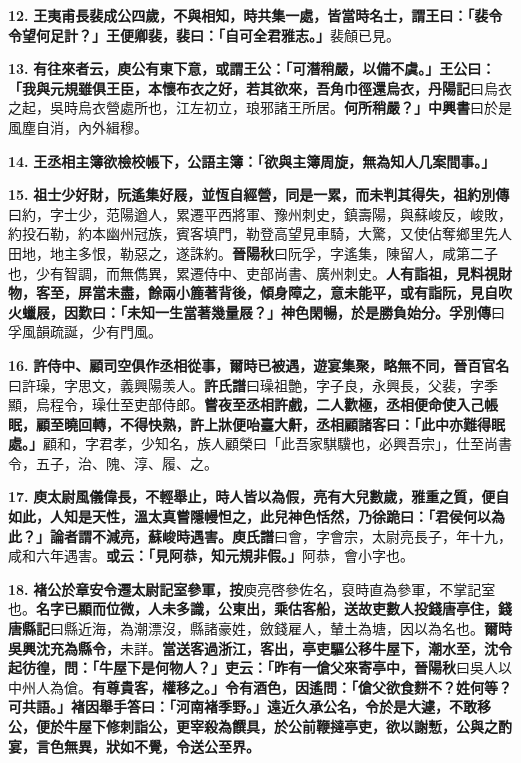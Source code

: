 \textbf{12.} \textbf{王夷甫長裴成公四歲，不與相知，時共集一處，皆當時名士，謂王曰：「裴令令望何足計？」王便卿裴，裴曰：「自可全君雅志。」}{\footnotesize 裴頠已見。}

\textbf{13.} \textbf{有往來者云，庾公有東下意，或謂王公：「可潛稍嚴，以備不虞。」王公曰：「我與元規雖俱王臣，本懷布衣之好，若其欲來，吾角巾徑還烏衣，}{\footnotesize \textbf{丹陽記}曰烏衣之起，吳時烏衣營處所也，江左初立，琅邪諸王所居。}\textbf{何所稍嚴？」}{\footnotesize \textbf{中興書}曰於是風塵自消，內外緝穆。}

\textbf{14.} \textbf{王丞相主簿欲檢校帳下，公語主簿：「欲與主簿周旋，無為知人几案間事。」}

\textbf{15.} \textbf{祖士少好財，阮遙集好屐，並恆自經營，同是一累，而未判其得失，}{\footnotesize \textbf{祖約別傳}曰約，字士少，范陽遒人，累遷平西將軍、豫州刺史，鎮壽陽，與蘇峻反，峻敗，約投石勒，約本幽州冠族，賓客填門，勒登高望見車騎，大驚，又使佔奪鄉里先人田地，地主多恨，勒惡之，遂誅約。\textbf{晉陽秋}曰阮孚，字遙集，陳留人，咸第二子也，少有智調，而無儁異，累遷侍中、吏部尚書、廣州刺史。}\textbf{人有詣祖，見料視財物，客至，屏當未盡，餘兩小簏著背後，傾身障之，意未能平，或有詣阮，見自吹火蠟屐，因歎曰：「未知一生當著幾量屐？」神色閑暢，於是勝負始分。}{\footnotesize \textbf{孚別傳}曰孚風韻疏誕，少有門風。}

\textbf{16.} \textbf{許侍中、顧司空俱作丞相從事，爾時已被遇，遊宴集聚，略無不同，}{\footnotesize \textbf{晉百官名}曰許璪，字思文，義興陽羡人。\textbf{許氏譜}曰璪祖艶，字子良，永興長，父裴，字季顯，烏程令，璪仕至吏部侍郎。}\textbf{嘗夜至丞相許戲，二人歡極，丞相便命使入己帳眠，顧至曉回轉，不得快熟，許上牀便咍臺大鼾，丞相顧諸客曰：「此中亦難得眠處。」}{\footnotesize 顧和，字君孝，少知名，族人顧榮曰「此吾家騏驥也，必興吾宗」，仕至尚書令，五子，治、隗、淳、履、之。}

\textbf{17.} \textbf{庾太尉風儀偉長，不輕舉止，時人皆以為假，亮有大兒數歲，雅重之質，便自如此，人知是天性，溫太真嘗隱幔怛之，此兒神色恬然，乃徐跪曰：「君侯何以為此？」論者謂不減亮，蘇峻時遇害。}{\footnotesize \textbf{庾氏譜}曰會，字會宗，太尉亮長子，年十九，咸和六年遇害。}\textbf{或云：「見阿恭，知元規非假。」}{\footnotesize 阿恭，會小字也。}

\textbf{18.} \textbf{褚公於章安令遷太尉記室參軍，}{\footnotesize \textbf{按}庾亮啓參佐名，裒時直為參軍，不掌記室也。}\textbf{名字已顯而位微，人未多識，公東出，乘估客船，送故吏數人投錢唐亭住，}{\footnotesize \textbf{錢唐縣記}曰縣近海，為潮漂沒，縣諸豪姓，斂錢雇人，輦土為塘，因以為名也。}\textbf{爾時吳興沈充為縣令，}{\footnotesize 未詳。}\textbf{當送客過浙江，客出，亭吏驅公移牛屋下，潮水至，沈令起彷徨，問：「牛屋下是何物人？」吏云：「昨有一傖父來寄亭中，}{\footnotesize \textbf{晉陽秋}曰吳人以中州人為傖。}\textbf{有尊貴客，權移之。」令有酒色，因遙問：「傖父欲食䴵不？姓何等？可共語。」褚因舉手答曰：「河南褚季野。」遠近久承公名，令於是大遽，不敢移公，便於牛屋下修刺詣公，更宰殺為饌具，於公前鞭撻亭吏，欲以謝慙，公與之酌宴，言色無異，狀如不覺，令送公至界。}

